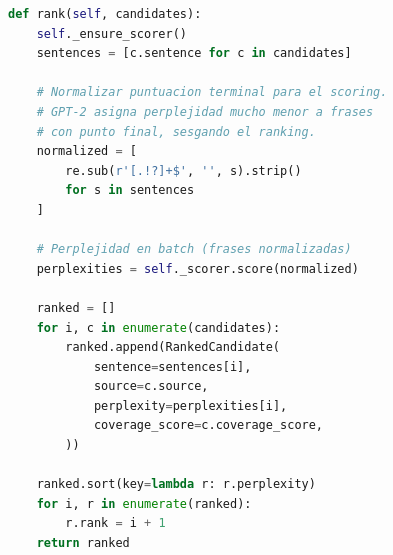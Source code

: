 \begin{lstlisting}[language=Python,caption={Ranking con normalización de puntuación (\texttt{ranker.py}).},label={lst:perplexity-ranker},basicstyle=\ttfamily\small,xleftmargin=1cm]
def rank(self, candidates):
    self._ensure_scorer()
    sentences = [c.sentence for c in candidates]

    # Normalizar puntuacion terminal para el scoring.
    # GPT-2 asigna perplejidad mucho menor a frases
    # con punto final, sesgando el ranking.
    normalized = [
        re.sub(r'[.!?]+$', '', s).strip()
        for s in sentences
    ]

    # Perplejidad en batch (frases normalizadas)
    perplexities = self._scorer.score(normalized)

    ranked = []
    for i, c in enumerate(candidates):
        ranked.append(RankedCandidate(
            sentence=sentences[i],
            source=c.source,
            perplexity=perplexities[i],
            coverage_score=c.coverage_score,
        ))

    ranked.sort(key=lambda r: r.perplexity)
    for i, r in enumerate(ranked):
        r.rank = i + 1
    return ranked
\end{lstlisting}
